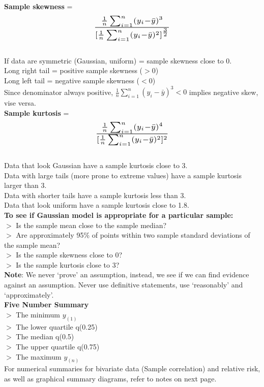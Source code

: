 \documentclass[a4paper,12pt]{article}
\begin{document}
\textbf{Sample skewness} = 
\[ \scalebox{1.5}{$\frac{\frac{1}{n}\sum_{i=1}^n(y_i-\bar{y})^3}{[\frac{1}{n}\sum_{i=1}^n(y_i-\bar{y})^2]^\frac{3}{2}}$} \]
\\If data are symmetric (Gaussian, uniform) = sample
skewness close to 0.
\\Long right
tail = positive sample
skewness ($>0$)
\\Long left tail
= negative sample
skewness ($<0$)
\\ Since denominator always positive, $\frac{1}{n}\sum_{i=1}^n(y_i-\bar{y})^3 < 0$ implies negative skew, vise versa.
\\

\textbf{Sample kurtosis} = 
\[ \scalebox{1.5}{$\frac{\frac{1}{n}\sum_{i=1}^n(y_i-\bar{y})^4}{[\frac{1}{n}\sum_{i=1}^n(y_i-\bar{y})^2]^2}$} \]
\\Data that look Gaussian have a sample kurtosis close to 3.
\\Data with large tails (more prone to extreme values) have a
sample kurtosis larger than 3.
\\Data with shorter tails have a sample kurtosis less than 3.
\\Data that look uniform have a sample kurtosis close to 1.8.
\\

\textbf{To see if Gaussian model is appropriate for a particular sample:}
\\ $>$ Is the sample mean close to the sample median?
\\ $>$ Are approximately 95\% of points within two sample standard
deviations of the sample mean?
\\ $>$ Is the sample skewness close to 0?
\\ $>$ Is the sample kurtosis close to 3?
\\\textbf{Note}: We never ‘prove’ an assumption, instead, we see if we can find evidence against an assumption. Never use definitive statements, use ‘reasonably’ and ‘approximately'.
\\

\textbf{Five Number Summary}
\\ $>$ The minimum $y_{(1)}$
\\ $>$ The lower quartile q(0.25)
\\ $>$ The median q(0.5)
\\ $>$ The upper quartile q(0.75)
\\ $>$ The maximum $y_{(n)}$
\\

For numerical summaries for bivariate data (Sample correlation) and relative risk, \\as well as graphical summary diagrams, refer to notes on next page.
\end{document}

